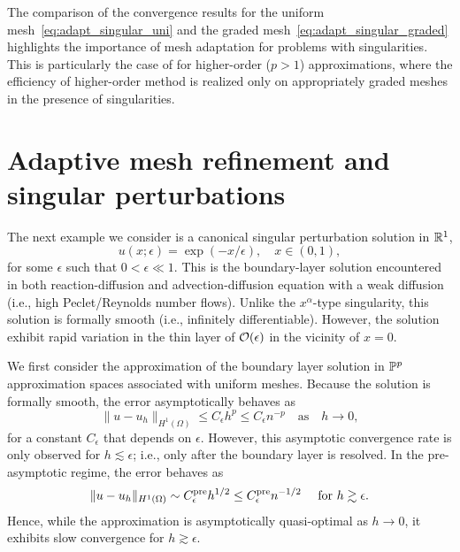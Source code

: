 The comparison of the convergence results for the uniform mesh~\eqref{eq:adapt_singular_uni} and the graded mesh~\eqref{eq:adapt_singular_graded} highlights the importance of mesh adaptation for problems with singularities.  This is particularly the case of for higher-order ($p > 1$) approximations, where the efficiency of higher-order method is realized only on appropriately graded meshes in the presence of singularities.


\section{Adaptive mesh refinement and singular perturbations}
\label{sec:adapt_singular_perturbation}
The next example we consider is a canonical singular perturbation solution in $\mathbb{R}^1$,
\begin{equation*}
  u(x;\epsilon) = \exp(-x/\epsilon), \quad x \in (0,1),
\end{equation*}
for some $\epsilon$ such that $0 < \epsilon \ll 1$. This is the boundary-layer solution encountered in both reaction-diffusion and advection-diffusion equation with a weak diffusion (i.e., high Peclet/Reynolds number flows).  Unlike the $x^\alpha$-type singularity, this solution is formally smooth (i.e., infinitely differentiable).  However, the solution exhibit rapid variation in the thin layer of $\mathcal{O}(\epsilon)$ in the vicinity of $x = 0$.

We first consider the approximation of the boundary layer solution in $\mathbb{P}^p$ approximation spaces associated with uniform meshes. Because the solution is formally smooth, the error asymptotically behaves as
\begin{equation*}
  \| u - u_h \|_{H^1(\Omega)} \leq C_{\epsilon} h^p \leq C_{\epsilon} n^{-p} \quad \text{as} \quad h \to 0,
\end{equation*}
for a constant $C_\epsilon$ that depends on $\epsilon$. However, this asymptotic convergence rate is only observed for $h \lesssim \epsilon$; i.e., only after the boundary layer is resolved.  In the pre-asymptotic regime, the error behaves as
\begin{equation*}
  \| u - u_h \|_{H^1(\Omega)} \sim C^{\rm pre}_{\epsilon} h^{1/2} \leq C^{\rm pre}_\epsilon n^{-1/2} \quad \text{ for } h \gtrsim \epsilon .
\end{equation*}
Hence, while the approximation is asymptotically quasi-optimal as $h \to 0$, it exhibits slow convergence for $h \gtrsim \epsilon$.


